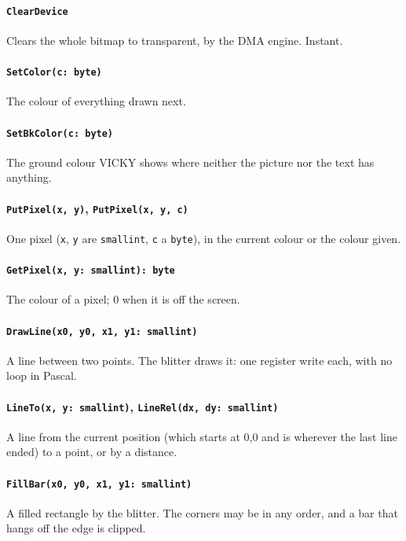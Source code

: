 \paragraph{\texttt{ClearDevice}} Clears the whole bitmap to transparent, by
the DMA engine. Instant.

\paragraph{\texttt{SetColor(c: byte)}} The colour of everything drawn next.

\paragraph{\texttt{SetBkColor(c: byte)}} The ground colour VICKY shows where
neither the picture nor the text has anything.

\paragraph{\texttt{PutPixel(x, y)}, \texttt{PutPixel(x, y, c)}}
One pixel (\verb|x|, \verb|y| are \verb|smallint|, \verb|c| a \verb|byte|), in the
current colour or the colour given.

\paragraph{\texttt{GetPixel(x, y: smallint): byte}} The colour of a pixel;
0 when it is off the screen.

\paragraph{\texttt{DrawLine(x0, y0, x1, y1: smallint)}} A line between two
points. The blitter draws it: one register write each, with no loop in
Pascal.

\paragraph{\texttt{LineTo(x, y: smallint)}, \texttt{LineRel(dx, dy: smallint)}}
A line from the current position (which starts at 0,0 and is wherever the
last line ended) to a point, or by a distance.

\paragraph{\texttt{FillBar(x0, y0, x1, y1: smallint)}} A filled rectangle by
the blitter. The corners may be in any order, and a bar that hangs off the
edge is clipped.

